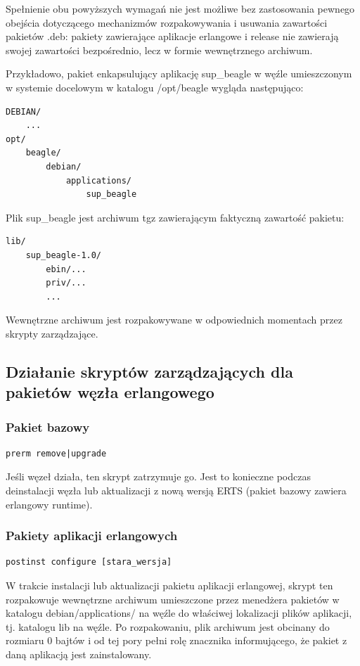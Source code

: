 \documentclass[polish,12pt]{aghthesis}
\begin{document}
Spełnienie obu powyższych wymagań nie jest możliwe bez zastosowania pewnego obejścia dotyczącego mechanizmów rozpakowywania i usuwania zawartości pakietów .deb: pakiety zawierające aplikacje erlangowe i release nie zawierają swojej zawartości bezpośrednio, lecz w formie wewnętrznego archiwum.

Przykładowo, pakiet enkapsulujący aplikację sup\_beagle w węźle umieszczonym w systemie docelowym w katalogu /opt/beagle wygląda następująco:

\begin{verbatim}
DEBIAN/
    ...
opt/
    beagle/
        debian/
            applications/
                sup_beagle
\end{verbatim}

Plik sup\_beagle jest archiwum tgz zawierającym faktyczną zawartość pakietu:

\begin{verbatim}
lib/
    sup_beagle-1.0/
        ebin/...
        priv/...
        ...
\end{verbatim}

Wewnętrzne archiwum jest rozpakowywane w odpowiednich momentach przez skrypty zarządzające.

\subsection{Działanie skryptów zarządzających dla pakietów węzła erlangowego}

\subsubsection{Pakiet bazowy}
\begin{verbatim}
prerm remove|upgrade
\end{verbatim}
Jeśli węzeł działa, ten skrypt zatrzymuje go. Jest to konieczne podczas deinstalacji węzła lub aktualizacji z nową wersją ERTS (pakiet bazowy zawiera erlangowy runtime).

\subsubsection{Pakiety aplikacji erlangowych}
\begin{verbatim}
postinst configure [stara_wersja]
\end{verbatim}

W trakcie instalacji lub aktualizacji pakietu aplikacji erlangowej, skrypt ten rozpakowuje wewnętrzne archiwum umieszczone przez menedżera pakietów w katalogu debian/applications/ na węźle do właściwej lokalizacji plików aplikacji, tj. katalogu lib na węźle. Po rozpakowaniu, plik archiwum jest obcinany do rozmiaru 0 bajtów i od tej pory pełni rolę znacznika informującego, że pakiet z daną aplikacją jest zainstalowany.
\end{document}
